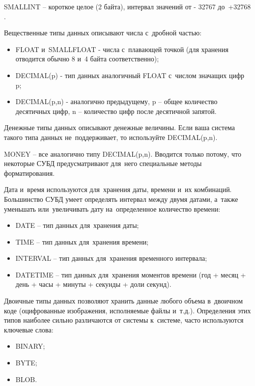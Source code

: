 \documentclass{ou}
\begin{document}
SMALLINT -- короткое целое (2 байта), интервал значений от - 32767 до~+32768 .
 
Вещественные типы данных описывают числа с~дробной частью:

\begin{itemize}[label=-, itemindent=4em, nosep]
\item FLOAT и~SMALLFLOAT - числа с~плавающей точкой (для хранения отводится обычно 8 и~4 байта соответственно);
\item DECIMAL(p) - тип данных аналогичный FLOAT с~числом значащих цифр p;
\item DECIMAL(p,n) - аналогично предыдущему, p -- общее количество десятичных цифр, n -- количество цифр после десятичной запятой.
\end{itemize}

Денежные типы данных описывают денежные величины. Если ваша система такого типа данных не~поддерживает, то используйте DECIMAL(p,n).

MONEY -- все аналогично типу DECIMAL(p,n). Вводится только потому, что некоторые СУБД предусматривают для~него специальные методы форматирования.

Дата и~время используются для~хранения даты, времени и~их комбинаций. Большинство СУБД умеет определять интервал между двумя датами, а~также уменьшать или~увеличивать дату на~определенное количество времени:

\begin{itemize}[label=-, itemindent=4em, nosep]
\item DATE -- тип данных для~хранения даты;
\item TIME -- тип данных для~хранения времени;
\item INTERVAL -- тип данных для~хранения временного интервала;
\item DATETIME -- тип данных для~хранения моментов времени (год + месяц + день + часы + минуты + секунды + доли секунд).
\end{itemize}

Двоичные типы данных позволяют хранить данные любого объема в~двоичном коде (оцифрованные изображения, исполняемые файлы и~т.д.). Определения этих типов наиболее сильно различаются от системы к~системе, часто используются ключевые слова:

\begin{itemize}[label=-, itemindent=4em, nosep]
\item BINARY;
\item BYTE;
\item BLOB.
\end{itemize}
\end{document}
